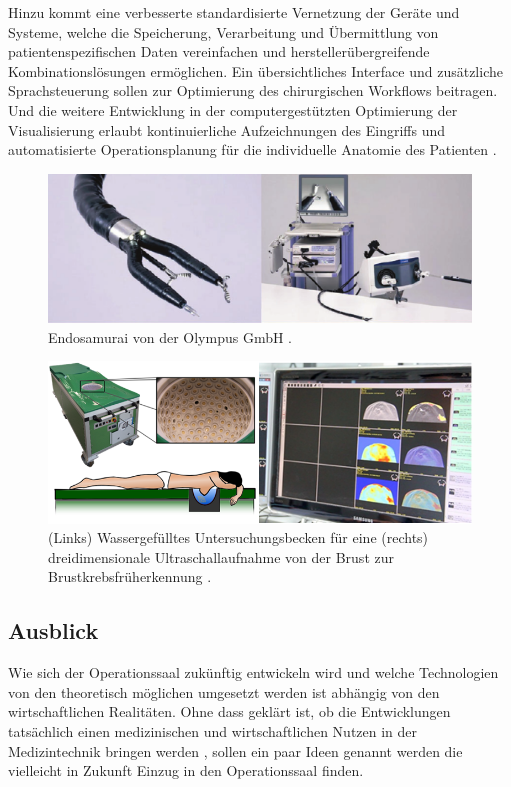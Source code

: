 Hinzu kommt eine verbesserte standardisierte Vernetzung der Geräte und Systeme, welche die Speicherung, Verarbeitung und Übermittlung von patientenspezifischen Daten vereinfachen und herstellerübergreifende Kombinationslösungen ermöglichen. Ein übersichtliches Interface und zusätzliche Sprachsteuerung sollen zur Optimierung des chirurgischen Workflows beitragen. Und die weitere Entwicklung in der computergestützten Optimierung der Visualisierung erlaubt kontinuierliche Aufzeichnungen des Eingriffs \cite{DerDigitaleOperationssaal} und automatisierte Operationsplanung für die individuelle Anatomie des Patienten \cite{CurrentAndFuture}. 

\begin{figure} [H]
	\includegraphics[scale = 0.7]{Content/Pictures/endosamurai.png}
	\caption{Endosamurai von der Olympus GmbH \cite{EndosamuraiBild}.} 
	\label{fig:endosamurai}
\end{figure}

\begin{figure} [H]
	\includegraphics[scale = 0.5]{Content/Pictures/us.png}
	\caption{(Links) Wassergefülltes Untersuchungsbecken für eine (rechts) dreidimensionale Ultraschallaufnahme von der Brust zur Brustkrebsfrüherkennung \cite{Ultraschall}.} 
	\label{fig:us}
\end{figure}


\subsection{Ausblick}
Wie sich der Operationssaal zukünftig entwickeln wird und welche Technologien von den theoretisch möglichen umgesetzt werden ist abhängig von den wirtschaftlichen Realitäten. Ohne dass geklärt ist, ob die Entwicklungen tatsächlich einen medizinischen und wirtschaftlichen Nutzen in der Medizintechnik bringen werden \cite{DerDigitaleOperationssaal}, sollen ein paar Ideen genannt werden die vielleicht in Zukunft Einzug in den Operationssaal finden.

